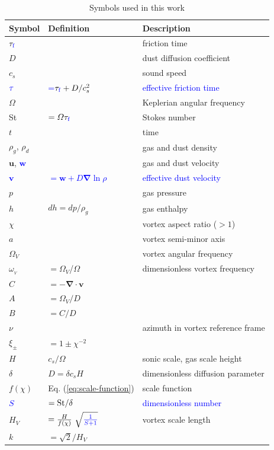 \documentclass[apj]{emulateapj}
\renewcommand{\v}[1]{{\boldsymbol{#1}}} %
\def\blue#1{\textcolor{blue}{#1}}
\newcommand{\del}{\v{\nabla}}
\newcommand{\grad}{\del}
\newcommand{\Div}{\del\cdot}
\newcommand{\Eq}[1]{Eq. (\ref{#1})}
\newcommand{\eq}[1]{\Eq{#1}}
\newcommand{\tauf}{\tau_{\rm \blue{f}}}
\newcommand{\St}{{\rm St}}
\begin{document}
\begin{table}
\caption[]{Symbols used in this work}
\label{table:symbols}
\begin{center}
\begin{tabular}{l l l}\hline
Symbol & Definition & Description \\\hline
$\tauf$ && friction time\\
$D$ & & dust diffusion coefficient \\
$c_s$ & & sound speed \\
$\blue{\tau}$ &\blue{=$\tauf + D/c_s^2$}& \blue{effective friction time}\\
$\varOmega$ & & Keplerian angular frequency \\
\St & $= \varOmega \tauf$ & Stokes number \\
$t$ &  & time \\
$\rho_g$, $\rho_d$  & & gas and dust density\\
$\v{u}$, \blue{$\v{w}$} & & gas and dust velocity\\
\blue{$\v{v}$} & \blue{$= \v{w} + D\grad\ln\rho$}& \blue{effective dust velocity} \\
$p$ && gas pressure \\
$h$ &$dh=dp/\rho_g$ & gas enthalpy\\
$\chi$ & & vortex aspect ratio ($>1$) \\
$a$ & & vortex semi-minor axis \\
$\varOmega_V$ & & vortex angular frequency \\
$\omega_{_V}$ &  $=\varOmega_V$/$\varOmega$ & dimensionless vortex frequency  \\
$C$ & $=-\Div{\v{v}}$ &  \\
$A$ & $=\varOmega_V/D$ & \\
$B$  &$=C/D$ & \\
$\nu$ & & azimuth in vortex reference frame\\
$\xi_\pm$ & $ = 1\pm\chi^{-2}$ \\
$H$ & $c_s/\varOmega$ & sonic scale, gas scale height\\
$\delta$ & $D=\delta c_s H$ & dimensionless diffusion parameter\\
$f(\chi)$ & \eq{eq:scale-function} & scale function \\
\blue{$S$} & \blue{$= \St/\delta$} & \blue{dimensionless number} \\
$H_V$ & $=\frac{H}{f(\chi)} \ \sqrt{\blue{\frac{1}{S+1}}}$ & vortex scale length \\
$k$ & $=\sqrt{2}/H_V$ & \\ 

\end{tabular}
\end{center}
\end{table}
\end{document}
